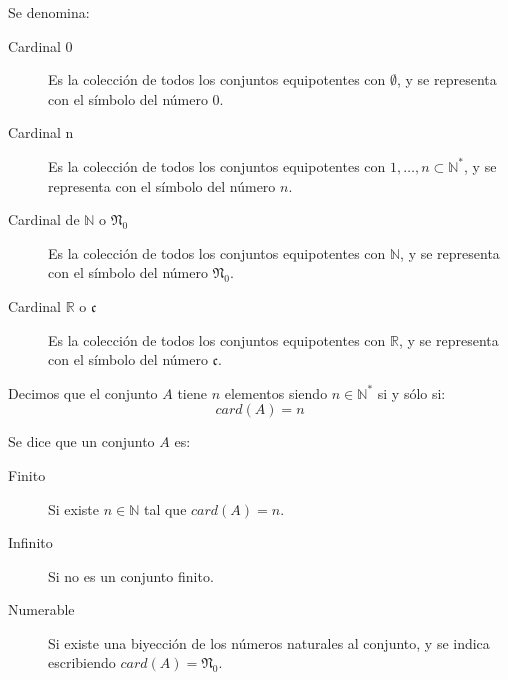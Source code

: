 Se denomina:
\begin{description}
\item[Cardinal 0] Es la colección de todos los conjuntos equipotentes con $\emptyset$, y se representa con el símbolo del número 0.
\item[Cardinal n] Es la colección de todos los conjuntos equipotentes con ${1,\ldots,n} \subset \mathbb{N}^*$, y se representa con el símbolo del número $n$.
\item[Cardinal de $\mathbb{N}$ o $\mathfrak{N}_0$] Es la colección de todos los conjuntos equipotentes con $\mathbb{N}$, y se representa con el símbolo del número $\mathfrak{N}_0$.
\item[Cardinal $\mathbb{R}$ o $\mathfrak{c}$] Es la colección de todos los conjuntos equipotentes con $\mathbb{R}$, y se representa con el símbolo del número $\mathfrak{c}$.
\end{description}

Decimos que el conjunto $A$ tiene $n$ elementos siendo $n \in \mathbb{N}^*$ si y sólo si:
\[
card(A)=n
\]

Se dice que un conjunto $A$ es:
\begin{description}
\item[Finito] Si existe $n \in \mathbb{N}$ tal que $card(A)=n$.
\item[Infinito] Si no es un conjunto finito.
\item[Numerable] Si existe una biyección de los números naturales al conjunto, y se indica escribiendo $card(A)=\mathfrak{N}_0$.
\end{description}